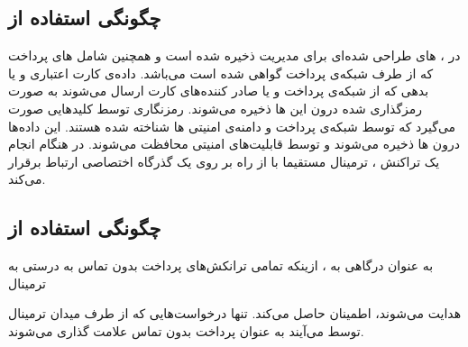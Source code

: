 \documentclass[oneside]{report}
\begin{document}
    \subsection{چگونگی استفاده {\small {}} از {\small {}}  ‌ }           
    در 
                  {\normalsize {}}
                  ،               {\normalsize {}} های طراحی شده‌ای  
                  برای مدیریت 
                                {\normalsize {}}
                                ذخیره شده است و همچنین شامل 
                                              {\normalsize {}} های پرداخت که از طرف شبکه‌ی پرداخت گواهی شده است می‌باشد. 
                                              داده‌ی کارت اعتباری و یا بدهی که از شبکه‌ی پرداخت و یا صادر کننده‌های کارت ارسال می‌شوند به صورت رمزگذاری شده درون این 
                                                            {\normalsize {}} ها 
     ذخیره می‌شوند. رمزنگاری توسط کلیدهایی صورت می‌گیرد که توسط شبکه‌ی پرداخت و دامنه‌ی امنیتی 
                   {\normalsize {}}ها 
                   شناخته شده هستند. این داده‌ها درون 
                                 {\normalsize {}} ها 
                                 ذخیره می‌شوند و توسط قابلیت‌های امنیتی
                                               {\normalsize {}}
                                               محافظت می‌شوند.
   در هنگام انجام یک تراکنش ، ترمینال مستقیما با 
                 {\normalsize {}}
                 از راه
                               {\normalsize {}}
                               بر روی یک گذرگاه اختصاصی ارتباط برقرار می‌کند.
                               
  
   \subsection{چگونگی استفاده {\small {}}  از {\small {}} }                                 
   به عنوان درگاهی به 
   {\normalsize {}}
   ،  {\normalsize {}}
   ازینکه تمامی ترانکش‌های پرداخت بدون تماس به درستی به ترمینال 

   {\normalsize {}}
   هدایت می‌شوند، اطمینان حاصل می‌کند.
   تنها درخواست‌هایی که از طرف میدان ترمینال توسط 
   {\normalsize {}}
   	می‌آیند به عنوان پرداخت بدون تماس علامت گذاری می‌شوند.
   	
\end{document}
